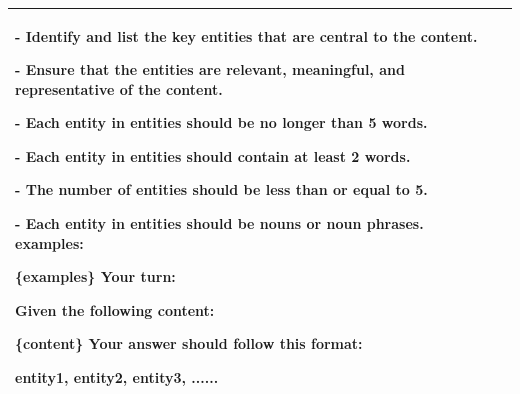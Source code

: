 \documentclass{article}
\theoremstyle{plain}
\theoremstyle{definition}
\theoremstyle{remark}
\begin{document}
\begin{table}[t]
\begin{tabular}{l | m{}}
- Identify and list the key entities that are central to the content.

- Ensure that the entities are relevant, meaningful, and representative of the content.

- Each entity in entities should be no longer than 5 words.

- Each entity in entities should contain at least 2 words.

- The number of entities should be less than or equal to 5.

- Each entity in entities should be nouns or noun phrases.
\newline\linebreak
examples:

\{examples\}
\newline\linebreak
Your turn:

Given the following content:

\{content\}
\newline\linebreak
Your answer should follow this format:

entity1, entity2, entity3, ......\\
		\bottomrule
	\end{tabular}
\end{table}
\end{document}
